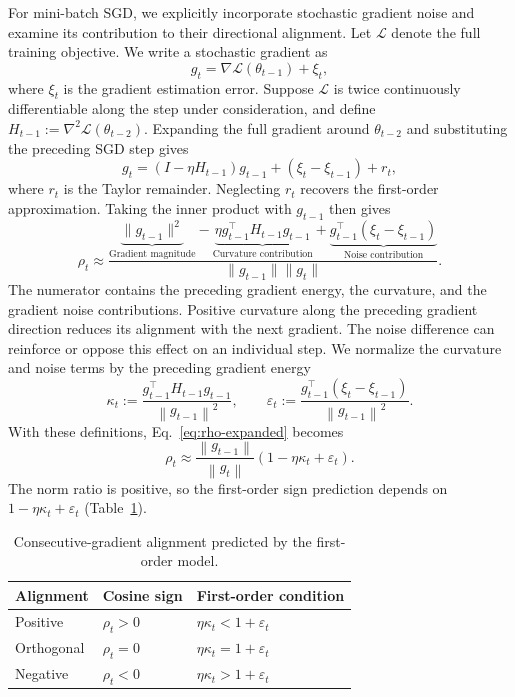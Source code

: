 \documentclass[11pt]{article}
\newcommand{\norm}[1]{\left\lVert#1\right\rVert}
\newcommand{\Loss}{\mathcal{L}}
\begin{document}
For mini-batch SGD, we explicitly incorporate stochastic gradient noise and examine its contribution to their directional alignment. Let $\Loss$ denote the full training objective. We write a stochastic gradient
as
\begin{equation}
  g_t=\nabla\Loss(\theta_{t-1})+\xi_t,
  \label{eq:noise-model}
\end{equation}
where $\xi_t$ is the gradient estimation error. Suppose $\Loss$ is twice
continuously differentiable along the step under consideration, and define
$H_{t-1}:=\nabla^2\Loss(\theta_{t-2})$. Expanding the full gradient around
$\theta_{t-2}$ and substituting the preceding SGD step gives
\begin{equation}
  g_t=(I-\eta H_{t-1})g_{t-1}+(\xi_t-\xi_{t-1})+r_t,
  \label{eq:gradient-evolution}
\end{equation}
where $r_t$ is the Taylor remainder. Neglecting $r_t$ recovers the first-order
approximation. Taking the inner product with $g_{t-1}$ then gives
\begin{equation}
\rho_t\approx
\frac{
\underbrace{\|g_{t-1}\|^2}_{\text{Gradient magnitude}}
-
\underbrace{\eta g_{t-1}^{\top}H_{t-1}g_{t-1}}_{\text{Curvature contribution}}
+
\underbrace{g_{t-1}^{\top}(\xi_t-\xi_{t-1})}_{\text{Noise contribution}}
}{
\|g_{t-1}\|\|g_t\|
}.
\label{eq:rho-expanded}
\end{equation}
The numerator contains the preceding gradient energy, the curvature,
and the gradient noise contributions. Positive curvature along the preceding
gradient direction reduces its alignment with the next gradient. The noise
difference can reinforce or oppose this effect on an individual step. We normalize the curvature and noise terms by the preceding gradient energy
\begin{equation}
  \kappa_t:=\frac{g_{t-1}^\top H_{t-1}g_{t-1}}{\norm{g_{t-1}}^2},
  \qquad
  \varepsilon_t:=\frac{g_{t-1}^\top(\xi_t-\xi_{t-1})}
                            {\norm{g_{t-1}}^2}.
  \label{eq:kappa-epsilon}
\end{equation}
With these definitions, Eq.~\eqref{eq:rho-expanded} becomes
\begin{equation}
  \boxed{\rho_t\approx\frac{\norm{g_{t-1}}}{\norm{g_t}}
                   (1-\eta\kappa_t+\varepsilon_t).}
  \label{eq:rho-normalized}
\end{equation}
The norm ratio is positive, so the first-order sign prediction depends on
$1-\eta\kappa_t+\varepsilon_t$ (Table~\ref{tab:sign}). 

\begin{table}[htbp]
\centering
\caption{Consecutive-gradient alignment predicted by the first-order model.}
\label{tab:sign}
\begin{tabular}{lll}
\toprule
Alignment & Cosine sign & First-order condition\\
\midrule
Positive & $\rho_t>0$ & $\eta\kappa_t<1+\varepsilon_t$\\
Orthogonal & $\rho_t=0$ & $\eta\kappa_t=1+\varepsilon_t$\\
Negative & $\rho_t<0$ & $\eta\kappa_t>1+\varepsilon_t$\\
\bottomrule
\end{tabular}
\end{table}
\end{document}

